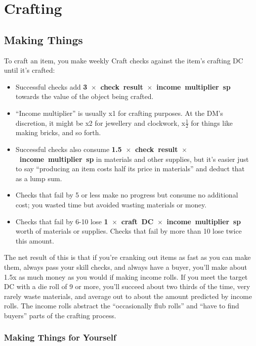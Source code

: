 
\chapter{Crafting}
\label{sect-crafting}

%
\section{Making Things}

To craft an item, you make weekly Craft checks against the item's crafting
DC until it's crafted:

\begin{itemize}
%
\item Successful checks add
\mbox{\bfseries 3 $\times$ check result $\times$ income multiplier sp}
towards the value of the object being crafted.
%
\item ``Income multiplier'' is usually x1 for crafting purposes. At the DM's
discretion, it might be x2 for jewellery and clockwork, x$\frac{1}{2}$ for
things like making bricks, and so forth.
%
\item Successful checks also consume
\mbox{\bfseries 1.5 $\times$ check result $\times$ income multiplier sp}
in materials and other supplies, but it's easier just to say ``producing an
item costs half its price in materials'' and deduct that as a lump sum.
%
\item Checks that fail by 5 or less make no progress but consume no
additional cost; you wasted time but avoided wasting materials or money.
%
\item Checks that fail by 6-10 lose
\mbox{\bfseries 1 $\times$ craft DC $\times$ income multiplier sp}
worth of materials or supplies. Checks that fail by more than 10 lose twice
this amount.
%
\end{itemize}

The net result of this is that if you're cranking out items as fast as you
can make them, always pass your skill checks, and always have a buyer,
you'll make about 1.5x as much money as you would if making income rolls.
If you meet the target DC with a die roll of 9 or more, you'll succeed
about two thirds of the time, very rarely waste materials, and average out
to about the amount predicted by income rolls. The income rolls abstract
the ``occasionally flub rolls'' and ``have to find buyers'' parts of the
crafting process.

%
\subsection{Making Things for Yourself}


